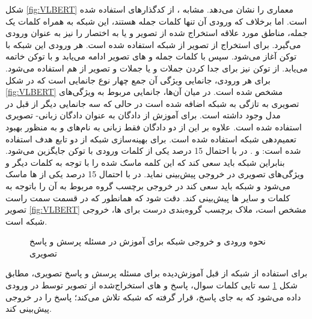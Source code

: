 	شکل
	\ref{fig:VLBERT}
	معماری 
		را نشان می‌دهد. مشابه 
	، از کدگذارهای
	استفاده شده است. اما برخلاف 
	که ورودی آن تنها کلمات جمله هستند، این شبکه به همراه کلمات یک جمله، مناطق مورد علاقه
	استخراج شده از تصویر و یا به اختصار
	را نیز به عنوان ورودی می‌گیرد. برای استخراج 
	از تصویر از شبکه 
	\cite{ren2015faster}
	استفاده شده است. هر ورودی این شبکه با توکن 
	\lr{[CLS]}
	آغاز می‌شود. سپس با کلمات جمله و 
	های تصویر ادامه می‌یابد و با توکن
	\lr{[END]}
	خاتمه می‌یابد. از توکن 
	\lr{[SEP]}
	نیز برای جدا کردن جملات و یا جملات و تصویر از هم استفاده می‌شود. برای هر ورودی، جانمایی ویژگی
	 آن جمع چهار نوع جانمایی است که در شکل 
	\ref{fig:VLBERT}
	 مشخص شده است. در میان آن‌ها، جانمایی مربوط به ویژگی‌های تصویری 
	 به تازگی به شبکه اضافه شده است در حالی که سه جانمایی دیگر از قبل در  مدل 
	 وجود داشته است. برای آموزش
	از  دادگان
	به عنوان ‌دادگان زبانی- تصویری استفاده شده است. علاوه بر این از دو ‌دادگان فقط زبانی به نام‌های 
	و 
	به منظور بهبود تعمیم‌دهی شبکه استفاده شده است. برای بهینه‌سازی شبکه 
	از دو تابع هدف استفاده شده است: 
	و
	.
	در
	با احتمال 15 درصد یکی از کلمات ورودی با توکن
	\lr{[MASK]}
	جایگزین می‌شود. بنابراین شبکه باید سعی کند که این کلمه ماسک شده را با توجه به کلمات دیگر و ویژگی‌های تصویری در خروجی پیش‌بینی نماید. در 
	با احتمال 15 درصد یکی از 
	ها ماسک ‌می‌شود و شبکه باید سعی کند در خروجی برچسب گروه مربوط به آن 
	را باتوجه به کلمات و سایر 
	ها پیش‌بینی کند. دقت شود که همانطور که در قسمت سمت راست تصویر
	\ref{fig:VLBERT}
	مشخص است، ملاک برچسب گروه‌بندی درست برای
	ها، خروجی شبکه
	است. 
	\begin{figure}
		\caption[نحوه ورودی و خروجی شبکه برای آموزش در مسئله پرسش و پاسخ تصویری]{نحوه ورودی و خروجی شبکه برای آموزش در مسئله پرسش و پاسخ تصویری\cite{su2019vl}}
		\label{fig:VLBERT-finetuning}
	\end{figure}
	برای استفاده از شبکه از قبل آموزش‌دیده
	برای مسئله پرسش و پاسخ تصویری، مطابق شکل
	\ref{fig:VLBERT-finetuning}
	سه تایی کلمات سوال، پاسخ و 
	های استخراج‌شده از تصویر توسط
	در ورودی داده می‌شود که به جای پاسخ،
	\lr{[MASK]}
	قرار گرفته که شبکه تلاش می‌کند؛ پاسخ را در خروجی پیش‌بینی کند.
